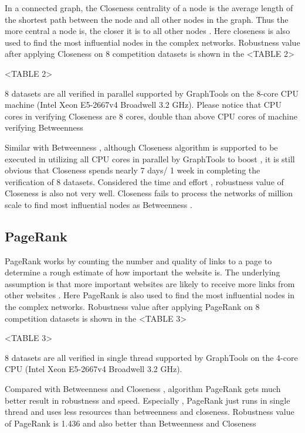 \documentclass{article}
\begin{document}
	
	In a connected graph, the Closeness centrality of a node is the average length of the shortest path between the node and all other nodes in the graph. Thus the more central a node is, the closer it is to all other nodes \cite{wikiClosenesscentrality}\cite{bavelas1950communication} . Here closeness is also used to find the most influential nodes in the complex networks. Robustness value after applying Closeness on 8 competition datasets is shown in the <TABLE 2>
	
	<TABLE 2>
	
	8 datasets are all verified in parallel supported by GraphTools \cite{peixotographtool2014} on the 8-core CPU machine (Intel Xeon E5-2667v4 Broadwell 3.2 GHz). Please notice that CPU cores in verifying Closeness are 8 cores, double than above CPU cores of machine verifying Betweenness
	
	Similar with Betweenness , although Closeness algorithm is supported to be executed in utilizing all CPU cores in parallel by GraphTools to boost , it is still obvious that Closeness spends nearly 7 days/ 1 week in completing the verification of 8 datasets. Considered the time and effort , robustness value of Closeness is also not very well. Closeness fails to process the networks of million scale to find most influential nodes as Betweenness .
	
	
	\subsection{PageRank}	
	
	
	PageRank works by counting the number and quality of links to a page to determine a rough estimate of how important the website is. The underlying assumption is that more important websites are likely to receive more links from other websites \cite{wikiPageRank}\cite{page1999pagerank}. Here PageRank is also used to find the most influential nodes in the complex networks. Robustness value after applying PageRank on 8 competition datasets is shown in the <TABLE 3>
	
	<TABLE 3>
	
	8 datasets are all verified in single thread supported by GraphTools \cite{peixotographtool2014} on the 4-core CPU (Intel Xeon E5-2667v4 Broadwell 3.2 GHz).
	
	Compared with Betweenness and Closeness , algorithm PageRank gets much better result in robustness and speed. Especially , PageRank just runs in single thread and uses less resources than betweenness and closeness. Robustness value of PageRank is 1.436 and also better than Betweenness and Closeness 
	
\end{document}
